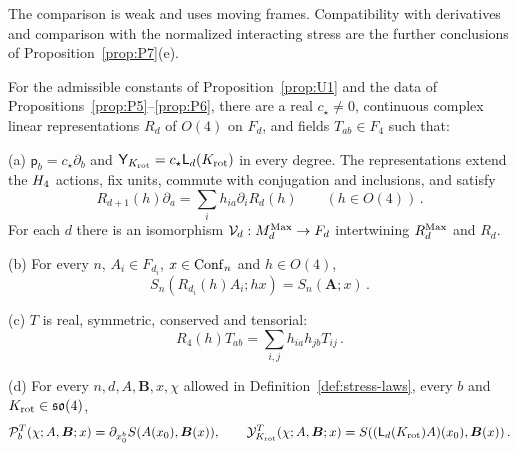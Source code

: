 \begin{remark}
The comparison is weak and uses moving frames. Compatibility with derivatives and comparison with the normalized interacting stress are the further conclusions of Proposition~\ref{prop:P7}\textup{(e)}.
\end{remark}

\begin{proposition}\label{prop:P7}
For the admissible constants of Proposition~\ref{prop:U1} and the data of Propositions~\ref{prop:P5}--\ref{prop:P6}, there are a real $c_\star\ne0$, continuous complex linear representations $R_d$ of $O(4)$ on $F_d$, and fields $T_{ab}\in F_4$ such that:

(a) $\mathsf p_b=c_\star\partial_b$ and $\mathsf Y_{K_{\rm rot}}=c_\star \mathsf L_d(K_{\rm rot})$ in every degree. The representations extend the $H_4$ actions, fix units, commute with conjugation and inclusions, and satisfy
\begin{equation}\label{eq:P7-1}
R_{d+1}(h)\partial_a=\sum_i h_{ia}\partial_iR_d(h)\qquad(h\in O(4))\,.
\end{equation}
For each $d$ there is an isomorphism $\mathcal V_d:M_{d}^{\mathrm{Max}}\to F_d$ intertwining $R_d^{\rm Max}$ and $R_d$.

(b) For every $n$, $A_i\in F_{d_i}$, $x\in\mathrm{Conf}_{n}$ and $h\in O(4)$,
\begin{equation}\label{eq:P7-2}
S_n(R_{d_i}(h)A_i;hx)=S_n(\boldsymbol A;x)\,.
\end{equation}

(c) $T$ is real, symmetric, conserved and tensorial:
\begin{equation}\label{eq:P7-3}
R_4(h)T_{ab}=\sum_{i,j}h_{ia}h_{jb}T_{ij}\,.
\end{equation}

(d) For every $n,d,A,\boldsymbol B,x,\chi$ allowed in Definition~\ref{def:stress-laws}, every $b$ and $K_{\rm rot}\in\mathfrak{so}(4)$,
\begin{equation}\label{eq:P7-4}
\mathcal P_b^T(\chi;A,\boldsymbol B;x)=\partial_{x_0^b}S(A(x_0),\boldsymbol B(x)),\qquad
\mathcal Y_{K_{\rm rot}}^T(\chi;A,\boldsymbol B;x)=S((\mathsf L_d(K_{\rm rot})A)(x_0),\boldsymbol B(x))\,.
\end{equation}


\end{proposition}
